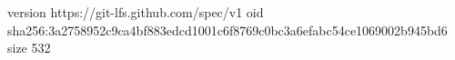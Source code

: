 version https://git-lfs.github.com/spec/v1
oid sha256:3a2758952c9ca4bf883edcd1001c6f8769c0bc3a6efabc54ce1069002b945bd6
size 532

